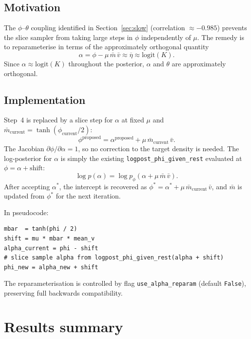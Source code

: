 \documentclass[11pt,a4paper]{article}
\begin{document}
\subsection{Motivation}

The $\phi$--$\theta$ coupling identified in Section~\ref{sec:slow} (correlation $\approx -0.985$) prevents the slice sampler from taking large steps in $\phi$ independently of $\mu$. The remedy is to reparameterise in terms of the approximately orthogonal quantity
\begin{equation}
  \alpha = \phi - \mu\,\bar{m}\,\bar{v} \approx \overline{\eta} \approx \text{logit}(K).
\end{equation}
Since $\alpha \approx \text{logit}(K)$ throughout the posterior, $\alpha$ and $\theta$ are approximately orthogonal.

\subsection{Implementation}

Step~4 is replaced by a slice step for $\alpha$ at fixed $\mu$ and $\bar{m}_{\text{current}} = \tanh(\phi_{\text{current}}/2)$:
\begin{equation}
  \phi^{\text{proposed}} = \alpha^{\text{proposed}} + \mu\,\bar{m}_{\text{current}}\,\bar{v}.
\end{equation}
The Jacobian $\partial\phi/\partial\alpha = 1$, so no correction to the target density is needed. The log-posterior for $\alpha$ is simply the existing \texttt{logpost\_phi\_given\_rest} evaluated at $\phi = \alpha + \text{shift}$:
\begin{equation}
  \log p(\alpha) = \log p_\phi\!\left(\alpha + \mu\,\bar{m}\,\bar{v}\right).
\end{equation}
After accepting $\alpha^*$, the intercept is recovered as $\phi^* = \alpha^* + \mu\,\bar{m}_{\text{current}}\,\bar{v}$, and $\bar{m}$ is updated from $\phi^*$ for the next iteration.

In pseudocode:
\begin{verbatim}
mbar  = tanh(phi / 2)
shift = mu * mbar * mean_v
alpha_current = phi - shift
# slice sample alpha from logpost_phi_given_rest(alpha + shift)
phi_new = alpha_new + shift
\end{verbatim}
The reparameterisation is controlled by flag \texttt{use\_alpha\_reparam} (default \texttt{False}), preserving full backwards compatibility.

\section{Results summary}
\end{document}

